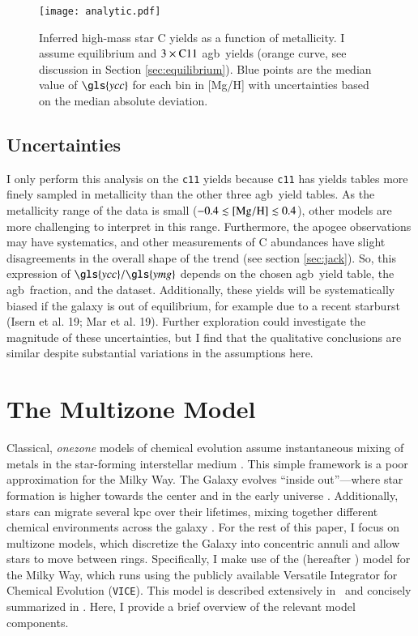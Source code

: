 \documentclass[12pt,oneside,letterpaper]{report}
\newcommand{\agb}{\gls{agb}}
\newcommand{\apogee}{\gls{apogee}}
\newcommand{\cxi}{\texttt{\gls{c11}}}
\newcommand{\Ycc}{\gls{ycc}}
\newcommand{\Yoc}{\gls{ymg}}
\newcommand{\JJ}{\citetalias{james+21}}
\newcommand{\VICE}{\texttt{VICE}}
\begin{document}
\begin{figure}[htp]
    \centering
    \texttt{[image: analytic.pdf]}
    \caption[Reverse fit yields]{Inferred high-mass star C yields as a function of metallicity. I assume equilibrium and $3\times {\rm C11}$ \agb\ yields (orange curve, see discussion in Section \ref{sec:equilibrium}). Blue points are the median value of $\Ycc$ for each bin in [Mg/H] with uncertainties based on the median absolute deviation.
    }
    \label{fig:analytic}
\end{figure}





\section{Uncertainties}

I only perform this analysis on the \cxi{} yields because \cxi{} has yields tables more finely sampled in metallicity than the other three \agb\ yield tables. As the metallicity range of the data is small ($-0.4\lesssim {\rm [Mg/H]} \lesssim 0.4$), other models are more challenging to interpret in this range. Furthermore, the \apogee{} observations may have systematics, and other measurements of C abundances \citep[e.g.][]{vincenzo+21} have slight disagreements in the overall shape of the trend (see section \ref{sec:jack}).
So, this expression of $\Ycc/\Yoc$ depends on the chosen \agb\ yield table, the \agb\ fraction, and the dataset. 
Additionally, these yields will be systematically biased if the galaxy is out of equilibrium, for example due to a recent starburst (Isern et al. 19; Mar et al. 19). Further exploration could investigate the magnitude of these uncertainties, but I find that the qualitative conclusions are similar despite substantial variations in the assumptions here.



\chapter{The Multizone Model}\label{sec:vice}

Classical, \textit{\gls{onezone}} models of chemical evolution assume instantaneous mixing of metals in the star-forming interstellar medium \citep[e.g.][]{matteucci21}. This simple framework is a poor approximation for the Milky Way.  The Galaxy evolves ``inside out''---where star formation is higher towards the center and in the early universe \citep{bird+13}. Additionally, stars can migrate several kpc over their lifetimes, mixing together different chemical environments across the galaxy \citep{bird+12,sellwood+binney02}. For the rest of this paper, I focus on \gls{multizone} models, which discretize the Galaxy into concentric annuli and allow stars to move between rings.  Specifically, I make use of the \citet{james+21} (hereafter \JJ) model for the Milky Way, which runs using the publicly available Versatile Integrator for Chemical Evolution (\VICE). This model is described extensively in \JJ~and concisely summarized  in \citet{james+23}. Here, I provide a brief overview of the relevant model components.
\end{document}
